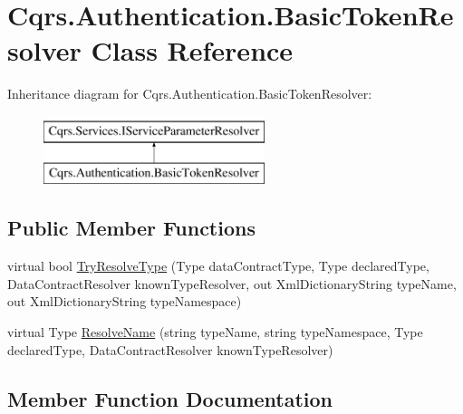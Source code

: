 \hypertarget{classCqrs_1_1Authentication_1_1BasicTokenResolver}{}\section{Cqrs.\+Authentication.\+Basic\+Token\+Resolver Class Reference}
\label{classCqrs_1_1Authentication_1_1BasicTokenResolver}
Inheritance diagram for Cqrs.\+Authentication.\+Basic\+Token\+Resolver\+:\begin{figure}[H]
\begin{center}
\leavevmode
\includegraphics[height=2.000000cm]{classCqrs_1_1Authentication_1_1BasicTokenResolver}
\end{center}
\end{figure}
\subsection*{Public Member Functions}
\begin{DoxyCompactItemize}
\item 
virtual bool \hyperlink{classCqrs_1_1Authentication_1_1BasicTokenResolver_aee92bd9283bf949149a351c8d8cdb079_aee92bd9283bf949149a351c8d8cdb079}{Try\+Resolve\+Type} (Type data\+Contract\+Type, Type declared\+Type, Data\+Contract\+Resolver known\+Type\+Resolver, out Xml\+Dictionary\+String type\+Name, out Xml\+Dictionary\+String type\+Namespace)
\item 
virtual Type \hyperlink{classCqrs_1_1Authentication_1_1BasicTokenResolver_aeb429e2f8dca2c8e96682be8d7a590bb_aeb429e2f8dca2c8e96682be8d7a590bb}{Resolve\+Name} (string type\+Name, string type\+Namespace, Type declared\+Type, Data\+Contract\+Resolver known\+Type\+Resolver)
\end{DoxyCompactItemize}


\subsection{Member Function Documentation}
\mbox{\label{classCqrs_1_1Authentication_1_1BasicTokenResolver_aeb429e2f8dca2c8e96682be8d7a590bb_aeb429e2f8dca2c8e96682be8d7a590bb}} 
